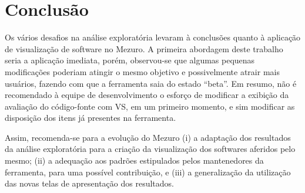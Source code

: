 \chapter[Conclusão]{Conclusão}\label{chap:conclusao}


Os vários desafios na análise exploratória levaram à conclusões quanto à
aplicação de visualização de software no Mezuro. A primeira abordagem deste
trabalho seria a aplicação imediata, porém, observou-se que algumas pequenas
modificações poderiam atingir o mesmo objetivo e possivelmente atrair mais
usuários, fazendo com que a ferramenta saia do estado ``beta''. Em resumo, não
é recomendado à equipe de desenvolvimento o esforço de modificar a exibição da
avaliação do código-fonte com VS, em um primeiro momento, e sim modificar as
disposição dos itens já presentes na ferramenta.

Assim, recomenda-se para a evolução do Mezuro (i) a adaptação dos resultados da
análise exploratória para a criação da visualização dos softwares
aferidos pelo mesmo; (ii) a adequação aos padrões estipulados pelos mantenedores da
ferramenta, para uma possível contribuição, e (iii) a generalização da utilização das
novas telas de apresentação dos resultados. 

